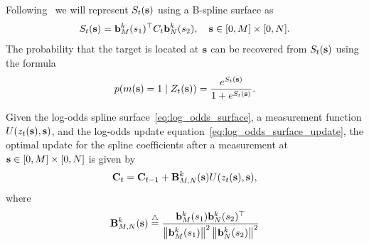 Following~\cite{RodriguesTsiogkasAguiar20} we will represent $S_t(\mathbf{s})$ using a B-spline surface as 
\begin{equation}\label{eq:log_odds_surface}
S_t(\sbf) = \bbf_M^k(s_1)^\top C_t \bbf_N^k(s_2), \quad \sbf \in [0,M]\times[0,N].
\end{equation}
The probability that the target is located at $\mathbf{s}$ can be recovered from $S_t(\mathbf{s})$ using the formula
\[
p(m(\mathbf{s})=1\mid Z_t(\mathbf{s})) = \frac{e^{S_t(\mathbf{s})}}{1+e^{S_t(\mathbf{s})}}.
\]

\begin{lemma}\label{lem:measurement_update_equation}
	Given the log-odds spline surface~\eqref{eq:log_odds_surface}, a measurement function $U(z_t(\mathbf{s}), \mathbf{s})$, and the log-odds update equation~\eqref{eq:log_odds_surface_update}, the optimal update for the spline coefficients after a measurement at $\mathbf{s} \in [0,M]\times[0,N]$ is given by
	\begin{equation}\label{eq:coefficient_update_3}
	\Cbf_t = \Cbf_{t-1} + \mathbf{B}_{M,N}^k(\sbf) U(z_t(\sbf), \sbf), 
	\end{equation}
	where
	\begin{equation}\label{eq:measurement_update_matrix_B}
	\mathbf{B}_{M,N}^k(\sbf) \defeq \frac{\bbf_M^k(s_1)\bbf_N^k(s_2)^\top}{\norm{\bbf_M^k(s_1)}^2\norm{\bbf_N^k(s_2)}^2}
	\end{equation}
\end{lemma}
